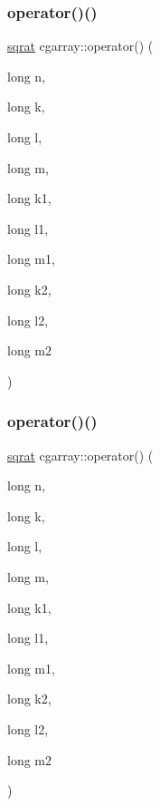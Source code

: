 \subsubsection{\texorpdfstring{operator()()}{operator()()}\hspace{0.1cm}{\footnotesize\ttfamily [1/3]}}
{\footnotesize\ttfamily \mbox{\hyperlink{classsqrat}{sqrat}} cgarray\+::operator() (\begin{DoxyParamCaption}\item[{long}]{n,  }\item[{long}]{k,  }\item[{long}]{l,  }\item[{long}]{m,  }\item[{long}]{k1,  }\item[{long}]{l1,  }\item[{long}]{m1,  }\item[{long}]{k2,  }\item[{long}]{l2,  }\item[{long}]{m2 }\end{DoxyParamCaption})}

\mbox{\label{classcgarray_ad55c1e537d3070a732d9355ed351d53e}} 
\subsubsection{\texorpdfstring{operator()()}{operator()()}\hspace{0.1cm}{\footnotesize\ttfamily [2/3]}}
{\footnotesize\ttfamily \mbox{\hyperlink{classsqrat}{sqrat}} cgarray\+::operator() (\begin{DoxyParamCaption}\item[{long}]{n,  }\item[{long}]{k,  }\item[{long}]{l,  }\item[{long}]{m,  }\item[{long}]{k1,  }\item[{long}]{l1,  }\item[{long}]{m1,  }\item[{long}]{k2,  }\item[{long}]{l2,  }\item[{long}]{m2 }\end{DoxyParamCaption})}

